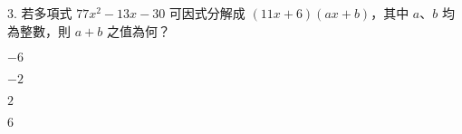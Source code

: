 \documentclass[12pt]{article}
\begin{document}
\begin{problem}
  \item[3.] 若多項式 $77x^2 - 13x - 30$ 可因式分解成 $(11x + 6)(ax + b)$，其中 $a$、$b$ 均為整數，則 $a + b$ 之值為何？
  \begin{choices}
    \item $-6$
    \item $-2$
    \item $2$
    \item $6$
  \end{choices}
\end{problem}
\end{document}
